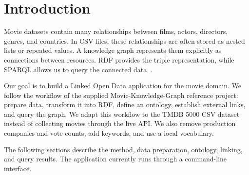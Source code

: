\section{Introduction}
Movie datasets contain many relationships between films, actors, directors, genres, and countries. In CSV files, these relationships are often stored as nested lists or repeated values. A knowledge graph represents them explicitly as connections between resources. RDF provides the triple representation, while SPARQL allows us to query the connected data~\cite{w3c2014rdf11,w3c2013sparql}.

Our goal is to build a Linked Open Data application for the movie domain. We follow the workflow of the supplied Movie-Knowledge-Graph reference project: prepare data, transform it into RDF, define an ontology, establish external links, and query the graph. We adapt this workflow to the TMDB 5000 CSV dataset instead of collecting movies through the live API. We also remove production companies and vote counts, add keywords, and use a local vocabulary.

The following sections describe the method, data preparation, ontology, linking, and query results. The application currently runs through a command-line interface.
